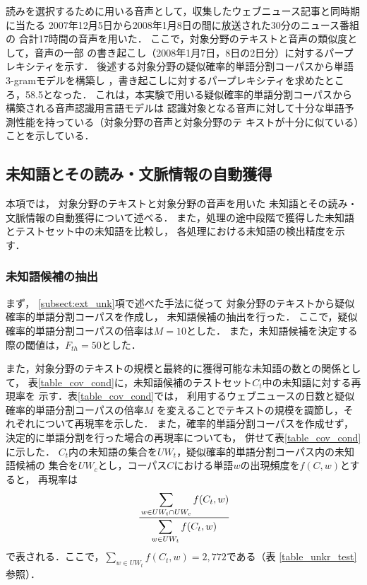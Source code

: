 \documentclass[japanese]{jnlp_1.4}
\begin{document}
読みを選択するために用いる音声として，収集したウェブニュース記事と同時期に当たる
2007年12月5日から2008年1月8日の間に放送された30分のニュース番組の
合計17時間の音声を用いた．
ここで，対象分野のテキストと音声の類似度として，音声の一部
の書き起こし（2008年1月7日，8日の2日分）に対するパープレキシティを示す．
後述する対象分野の疑似確率的単語分割コーパスから単語3-gramモデルを構築し
，書き起こしに対するパープレキシティを求めたところ，58.5となった．
これは，本実験で用いる疑似確率的単語分割コーパスから構築される音声認識用言語モデルは
認識対象となる音声に対して十分な単語予測性能を持っている（対象分野の音声と対象分野のテ
キストが十分に似ている）ことを示している．


\subsection{未知語とその読み・文脈情報の自動獲得}
\label{subsect:ex_ext}

本項では，
対象分野のテキストと対象分野の音声を用いた
未知語とその読み・文脈情報の自動獲得について述べる．
また，処理の途中段階で獲得した未知語とテストセット中の未知語を比較し，
各処理における未知語の検出精度を示す．


\subsubsection{未知語候補の抽出}

まず，
\ref{subsect:ext_unk}項で述べた手法に従って
対象分野のテキストから疑似確率的単語分割コーパスを作成し，
未知語候補の抽出を行った．
ここで，疑似確率的単語分割コーパスの倍率は$M=10$とした．
また，未知語候補を決定する際の閾値は，$F_{th} = 50$とした．

また，対象分野のテキストの規模と最終的に獲得可能な未知語の数との関係として，
表\ref{table_cov_cond}に，未知語候補のテストセット$C_t$中の未知語に対する再現率を
示す．表\ref{table_cov_cond}では，
利用するウェブニュースの日数と疑似確率的単語分割コーパスの倍率$M$
を変えることでテキストの規模を調節し，それぞれについて再現率を示した．
また，確率的単語分割コーパスを作成せず，決定的に単語分割を行った場合の再現率についても，
併せて表\ref{table_cov_cond}に示した．
$C_t$内の未知語の集合を$UW_t$，疑似確率的単語分割コーパス内の未知語候補の
集合を$UW_c$とし，コーパス$C$における単語$w$の出現頻度を$f(C,w)$とすると，
再現率は
\[
\cfrac{\displaystyle\sum_{w \in UW_t \cap UW_c} f(C_t, w)}{\displaystyle\sum_{w \in UW_t } f(C_t, w)}
\]
で表される．ここで，$\sum_{w \in UW_t } f(C_t, w) = 2,772$である（表
\ref{table_unkr_test}参照）．
\end{document}
